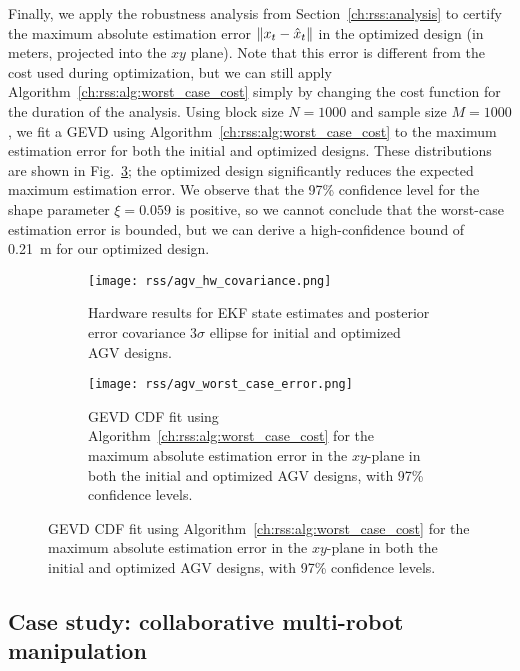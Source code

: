 Finally, we apply the robustness analysis from Section~\ref{ch:rss:analysis} to certify the maximum absolute estimation error $\left\lVert x_t - \hat{x}_t\right\rVert$ in the optimized design (in meters, projected into the $xy$ plane). Note that this error is different from the cost used during optimization, but we can still apply Algorithm~\ref{ch:rss:alg:worst_case_cost} simply by changing the cost function for the duration of the analysis. Using block size $N = 1000$ and sample size $M = 1000$, we fit a GEVD using Algorithm~\ref{ch:rss:alg:worst_case_cost} to the maximum estimation error for both the initial and optimized designs. These distributions are shown in Fig.~\ref{ch:rss:fig:agv_gevd}; the optimized design significantly reduces the expected maximum estimation error. We observe that the 97\% confidence level for the shape parameter $\xi = 0.059$ is positive, so we cannot conclude that the worst-case estimation error is bounded, but we can derive a high-confidence bound of \SI{0.21}{m} for our optimized design.

\begin{figure}[tb]
    \centering
    \begin{subfigure}[c]{0.45\linewidth}
        \centering
        \texttt{[image: rss/agv\_hw\_covariance.png]}
        \caption{Hardware results for EKF state estimates and posterior error covariance $3\sigma$ ellipse for initial and optimized AGV designs.}
        \label{ch:rss:fig:agv_hw_cov}
    \end{subfigure}
    \quad
    \begin{subfigure}[c]{0.45\linewidth}
        \centering
        \texttt{[image: rss/agv\_worst\_case\_error.png]}
        \caption{GEVD CDF fit using Algorithm~\ref{ch:rss:alg:worst_case_cost} for the maximum absolute estimation error in the $xy$-plane in both the initial and optimized AGV designs, with 97\% confidence levels.}
        \label{ch:rss:fig:agv_gevd}
    \end{subfigure}
\end{figure}

\subsection{Case study: collaborative multi-robot manipulation}\label{ch:rss:case2}

